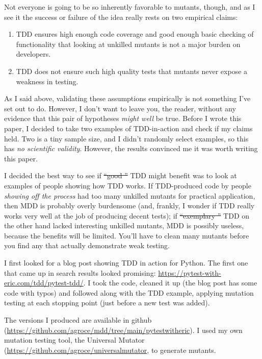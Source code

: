 \documentclass[sigplan,screen]{acmart}
\providecommand{\DIFadd}[1]{{\protect\color{blue}\uwave{#1}}} %
\providecommand{\DIFdel}[1]{{\protect\color{red}\sout{#1}}}                      %
\providecommand{\DIFaddbegin}{} %
\providecommand{\DIFaddend}{} %
\providecommand{\DIFdelbegin}{} %
\providecommand{\DIFdelend}{} %
\newcommand{\DIFscaledelfig}{0.5}
\newlength{\DIFdelgraphicswidth} %
\newlength{\DIFdelgraphicsheight} %
\newcommand{\DIFaddincludegraphics}[2][]{{\color{blue}\fbox{\DIFOincludegraphics[#1]{#2}}}} %
\newcommand{\DIFdelincludegraphics}[2][]{%
\sbox{\DIFdelgraphicsbox}{\DIFOincludegraphics[#1]{#2}}%
\settoboxwidth{\DIFdelgraphicswidth}{\DIFdelgraphicsbox} %
\settoboxtotalheight{\DIFdelgraphicsheight}{\DIFdelgraphicsbox} %
\scalebox{\DIFscaledelfig}{%
\parbox[b]{\DIFdelgraphicswidth}{\usebox{\DIFdelgraphicsbox}\\[-\baselineskip] \rule{\DIFdelgraphicswidth}{0em}}\llap{\resizebox{\DIFdelgraphicswidth}{\DIFdelgraphicsheight}{%
\setlength{\unitlength}{\DIFdelgraphicswidth}%
\begin{picture}(1,1)%
\thicklines\linethickness{2pt} %
{\color[rgb]{1,0,0}\put(0,0){\framebox(1,1){}}}%
{\color[rgb]{1,0,0}\put(0,0){\line( 1,1){1}}}%
{\color[rgb]{1,0,0}\put(0,1){\line(1,-1){1}}}%
\end{picture}%
}\hspace*{3pt}}} %
} %
\DeclareRobustCommand{\DIFaddbegin}{\DIFOaddbegin \let\includegraphics\DIFaddincludegraphics} %
\DeclareRobustCommand{\DIFaddend}{\DIFOaddend \let\includegraphics\DIFOincludegraphics} %
\DeclareRobustCommand{\DIFdelbegin}{\DIFOdelbegin \let\includegraphics\DIFdelincludegraphics} %
\DeclareRobustCommand{\DIFdelend}{\DIFOaddend \let\includegraphics\DIFOincludegraphics} %
\begin{document}
Not everyone is going to be so inherently favorable to mutants,
though, and as I see it the success or failure of the idea really
rests on two empirical claims:

\begin{enumerate}
  \item TDD ensures high enough code coverage and good enough basic
    checking of functionality that looking at unkilled mutants is not
    a major burden on developers.
    \item TDD does not ensure such high quality tests that mutants
      never expose a weakness in testing.
    \end{enumerate}

    As I said above, validating these assumptions empirically is not
    something I've set out to do.  However, I don't want to leave you,
    the reader, without any evidence that this pair of hypotheses
    \emph{might well} be true.  Before I wrote this paper, I decided
    to take two examples of TDD-in-action and check if my claims
    held.  Two is a tiny sample size, and I didn't randomly select
    examples, so this has \emph{no scientific validity}.  However, the
    results convinced me it was worth writing this paper.

    I decided the best way to see if \DIFdelbegin \DIFdel{``good '' }\DIFdelend \DIFaddbegin \DIFadd{good }\DIFaddend TDD might benefit was to
    look at examples of people showing how TDD works.  If TDD-produced
    code by people \emph{showing off the process} had too many
    unkilled mutants for practical application, then MDD is probably
    overly burdensome (and, frankly, I wonder if TDD really works very
    well at the job of producing decent tests); if \DIFdelbegin \DIFdel{``exemplary '' }\DIFdelend \DIFaddbegin \DIFadd{exemplary }\DIFaddend TDD
    on the other hand lacked interesting unkilled mutants, MDD is
    possibly useless, because the benefits will be limited.  You'll
    have to clean many mutants before you find any that actually
    demonstrate weak testing.

    I first looked for a blog post showing TDD in action for Python.
    The first one that came up in search results looked promising:
    \url{https://pytest-with-eric.com/tdd/pytest-tdd/}.  I took the
    code, cleaned it up (the blog post has some code with typos) and
    followed along with the TDD example, applying mutation testing at
    each stopping point (just before a new test was added).

    The versions I produced are available in github
    (\url{https://github.com/agroce/mdd/tree/main/pytestwitheric}).  I
    used my own mutation testing tool, the Universal
    Mutator~\cite{SyntaxUM}
    (\url{https://github.com/agroce/universalmutator}, to generate
    mutants.
\end{document}
